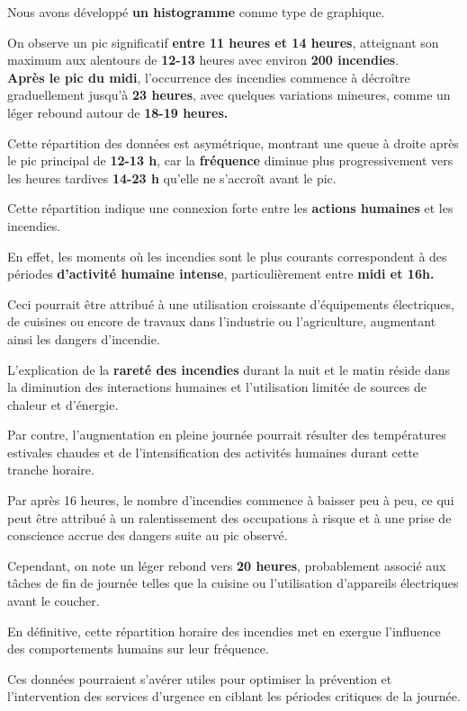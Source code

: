 \documentclass[
]{article}
\begin{document}
Nous avons développé \textbf{un histogramme} comme type de graphique.

On observe un pic significatif \textbf{entre 11 heures et 14 heures},
atteignant son maximum aux alentours de \textbf{12-13} heures avec
environ \textbf{200 incendies}.\\
\textbf{Après le pic du midi}, l'occurrence des incendies commence à
décroître graduellement jusqu'à \textbf{23 heures}, avec quelques
variations mineures, comme un léger rebound autour de \textbf{18-19
heures.}

Cette répartition des données est asymétrique, montrant une queue à
droite après le pic principal de \textbf{12-13 h}, car la
\textbf{fréquence} diminue plus progressivement vers les heures tardives
\textbf{14-23 h} qu'elle ne s'accroît avant le pic.

Cette répartition indique une connexion forte entre les \textbf{actions
humaines} et les incendies.

En effet, les moments où les incendies sont le plus courants
correspondent à des périodes \textbf{d'activité humaine intense},
particulièrement entre \textbf{midi et 16h.}

Ceci pourrait être attribué à une utilisation croissante d'équipements
électriques, de cuisines ou encore de travaux dans l'industrie ou
l'agriculture, augmentant ainsi les dangers d'incendie.

L'explication de la \textbf{rareté des incendies} durant la nuit et le
matin réside dans la diminution des interactions humaines et
l'utilisation limitée de sources de chaleur et d'énergie.

Par contre, l'augmentation en pleine journée pourrait résulter des
températures estivales chaudes et de l'intensification des activités
humaines durant cette tranche horaire.

Par après 16 heures, le nombre d'incendies commence à baisser peu à peu,
ce qui peut être attribué à un ralentissement des occupations à risque
et à une prise de conscience accrue des dangers suite au pic observé.

Cependant, on note un léger rebond vers \textbf{20 heures}, probablement
associé aux tâches de fin de journée telles que la cuisine ou
l'utilisation d'appareils électriques avant le coucher.

En définitive, cette répartition horaire des incendies met en exergue
l'influence des comportements humains sur leur fréquence.

Ces données pourraient s'avérer utiles pour optimiser la prévention et
l'intervention des services d'urgence en ciblant les périodes critiques
de la journée.
\end{document}
